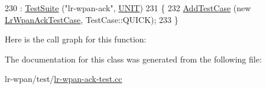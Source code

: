 \begin{DoxyCode}
230   : \hyperlink{classns3_1_1TestSuite_a904b0c40583b744d30908aeb94636d1a}{TestSuite} (\textcolor{stringliteral}{"lr-wpan-ack"}, \hyperlink{classns3_1_1TestSuite_a1ebfcab34ec8161e085e8e3a1855eae0a3885375a3787abf60431f8454b3cadbd}{UNIT})
231 \{
232   \hyperlink{classns3_1_1TestCase_a3718088e3eefd5d6454569d2e0ddd835}{AddTestCase} (\textcolor{keyword}{new} \hyperlink{classLrWpanAckTestCase}{LrWpanAckTestCase}, TestCase::QUICK);
233 \}
\end{DoxyCode}


Here is the call graph for this function\+:




The documentation for this class was generated from the following file\+:\begin{DoxyCompactItemize}
\item 
lr-\/wpan/test/\hyperlink{lr-wpan-ack-test_8cc}{lr-\/wpan-\/ack-\/test.\+cc}\end{DoxyCompactItemize}
